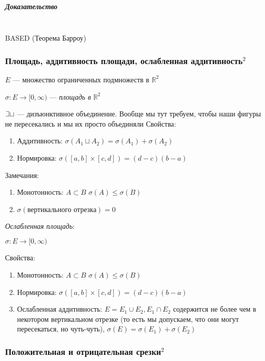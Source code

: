\documentclass{article}
\def\letus{%
\mathord{\setbox0=\hbox{$\exists$}%
         \hbox{\kern 0.125\wd0%
               \vbox to \ht0{%
                  \hrule width 0.75\wd0%
                  \vfill%
                  \hrule width 0.75\wd0}%
               \vrule height \ht0%
               \kern 0.125\wd0}%
       }%
        }
\def\dbl{\,\,}
\let\vanillasubparagraph\subparagraph
\renewcommand{\subparagraph}[1]{\vanillasubparagraph{#1}\mbox{}\\}
\begin{document}
\subparagraph{Доказательство}
BASED (Теорема Барроу)


\subsubsection{Площадь, аддитивность площади, ослабленная аддитивность\texorpdfstring{$^2$}{}}

$E$ --- множество ограниченных подмножеств в $\mathbb{R}^2$

$\sigma: E \rightarrow [0, \infty)$ --- \textit{площадь в} $\mathbb{R}^2$

$\letus \sqcup$ --- дизъюнктивное объединение. Вообще мы тут требуем, чтобы наши фигуры не пересекались и мы их просто объединяли
Свойства:

\begin{enumerate}
    \item Аддитивность: $\sigma(A_1 \sqcup A_2) = \sigma(A_1) + \sigma(A_2)$
    \item Нормировка: $\sigma([a, b] \times [c, d]) = (d - c)(b - a)$
\end{enumerate}

Замечания:

\begin{enumerate}
    \item Монотонность: $A \subset B \dbl \sigma(A) \le \sigma(B)$
    \item $\sigma(\textit{вертикального отрезка}) = 0$
\end{enumerate}

\textit{Ослабленная площадь}:

$\sigma: E \rightarrow [0, \infty)$

Свойства:

\begin{enumerate}
    \item Монотонность: $A \subset B \dbl \sigma(A) \le \sigma(B)$
    \item Нормировка: $\sigma([a, b] \times [c, d]) = (d - c)(b - a)$
    \item Ослабленная аддитивность: $E = E_1 \cup E_2, E_1 \cap E_2$ содержится не более чем в некотором вертикальном отрезке (то есть мы допускаем, что они могут пересекаться, но чуть-чуть), $\sigma(E) = \sigma(E_1) + \sigma(E_2)$
\end{enumerate}

\subsubsection{Положительная и отрицательная срезки\texorpdfstring{$^2$}{}}
\end{document}
